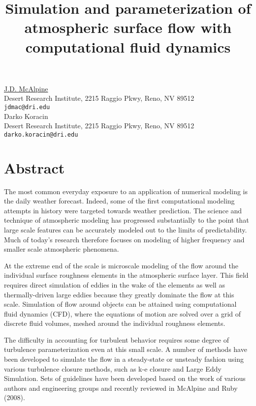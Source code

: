 


\title{Simulation and parameterization of atmospheric surface flow with computational fluid dynamics}
\author{} %
\institute{}

\tocauthor{}
\maketitle
\begin{center}
{\large \underline{J.D. McAlpine}}\\
Desert Research Institute, 2215 Raggio Pkwy, Reno, NV 89512\\
{\tt jdmac@dri.edu}\\

{\large Darko Koracin}\\
Desert Research Institute, 2215 Raggio Pkwy, Reno, NV 89512\\
{\tt darko.koracin@dri.edu}
\end{center}

\section*{Abstract}

 The most common everyday exposure to an application of numerical modeling is the daily weather forecast. Indeed,
 some of the first computational modeling attempts in history were targeted towards weather prediction. The science
 and technique of atmospheric modeling has progressed substantially to the point that large scale features can be 
 accurately modeled out to the limits of predictability. Much of today\textquoteright s research therefore focuses on modeling of 
 higher frequency and smaller scale atmospheric phenomena. 

 At the extreme end of the scale is microscale modeling of the flow around the individual surface roughness elements 
in the atmospheric surface layer. This field requires direct simulation of eddies in the wake of the elements as well 
as thermally-driven large eddies because they greatly dominate the flow at this scale. Simulation of flow around objects
 can be attained using computational fluid dynamics (CFD), where the equations of motion are solved over a grid of discrete 
fluid volumes, meshed around the individual roughness elements.

 The difficulty in accounting for turbulent behavior requires some degree of turbulence parameterization even at this 
small scale. A number of methods have been developed to simulate the flow in a steady-state or unsteady fashion using 
various turbulence closure methods, such as k-e closure and Large Eddy Simulation. Sets of guidelines have been developed 
based on the work of various authors and engineering groups and recently reviewed in McAlpine and Ruby (2008). 

